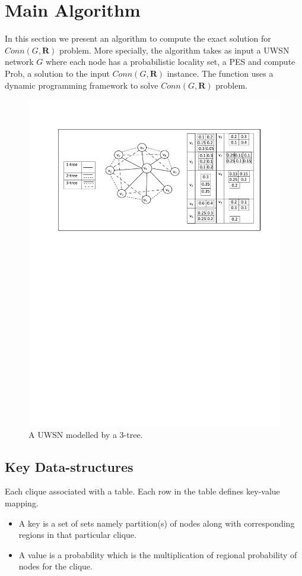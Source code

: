 \documentclass[12pt]{article}
\begin{document}
\section{Main Algorithm}
\label{subsec:mainAlg}
In this section we present an algorithm to compute the exact solution for $Conn(G,\textbf{R})$ problem. More specially, the algorithm  takes as input a UWSN network $G$ where each node has a probabilistic locality set, a PES and compute Prob, a solution to the input $Conn(G,\textbf{R})$ instance. The function uses a dynamic programming framework to solve $Conn(G,\textbf{R})$ problem.\\
\begin{figure}[h]
\centering
\includegraphics[width=5 in, height=2.5 in]{Example1.pdf}
 \caption{ A UWSN modelled by a $3$-tree.
 \label{fig:3t}
}
\end{figure}
\subsection{Key Data-structures}
\label{subsec:kds}
Each clique associated with a table. Each row in the table defines key-value mapping.
\begin{itemize}[noitemsep,nolistsep]
\item A key is a set of sets namely partition(s) of nodes along with corresponding regions in that particular clique. 
\item A value is a probability which is the multiplication of regional probability of nodes for the clique.
\end{itemize}
\end{document}
